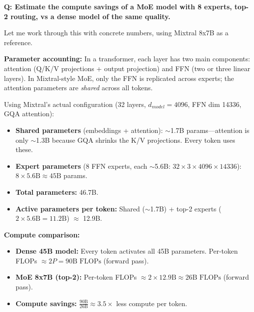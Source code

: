 \begin{interviewq}
\end{interviewq}

\begin{interviewq}
\textbf{Q: Estimate the compute savings of a MoE model with 8 experts, top-2 routing, vs a dense model of the same quality.}

 \quad {} \quad \badgefreq{\freqmed}

\stronganswer

Let me work through this with concrete numbers, using Mixtral 8x7B as a reference.

\textbf{Parameter accounting:} In a transformer, each layer has two main components: attention (Q/K/V projections + output projection) and FFN (two or three linear layers). In Mixtral-style MoE, only the FFN is replicated across experts; the attention parameters are \textit{shared} across all tokens.

Using Mixtral's actual configuration (32 layers, $d_{model} = 4096$, FFN dim 14336, GQA attention):
\begin{itemize}
    \item \textbf{Shared parameters} (embeddings + attention): $\sim$1.7B params---attention is only $\sim$1.3B because GQA shrinks the K/V projections. Every token uses these.
    \item \textbf{Expert parameters} (8 FFN experts, each $\sim$5.6B: $32 \times 3 \times 4096 \times 14336$): $8 \times 5.6\text{B} \approx 45\text{B}$ params.
    \item \textbf{Total parameters:} 46.7B.
    \item \textbf{Active parameters per token:} Shared ($\sim$1.7B) + top-2 experts ($2 \times 5.6\text{B} = 11.2\text{B}$) $\approx$ 12.9B.
\end{itemize}

\textbf{Compute comparison:}
\begin{itemize}
    \item \textbf{Dense 45B model:} Every token activates all 45B parameters. Per-token FLOPs $\approx 2P = 90\text{B FLOPs}$ (forward pass).
    \item \textbf{MoE 8x7B (top-2):} Per-token FLOPs $\approx 2 \times 12.9\text{B} \approx 26\text{B FLOPs}$ (forward pass).
    \item \textbf{Compute savings:} $\frac{90\text{B}}{26\text{B}} \approx 3.5\times$ less compute per token.
\end{itemize}


\end{interviewq}
